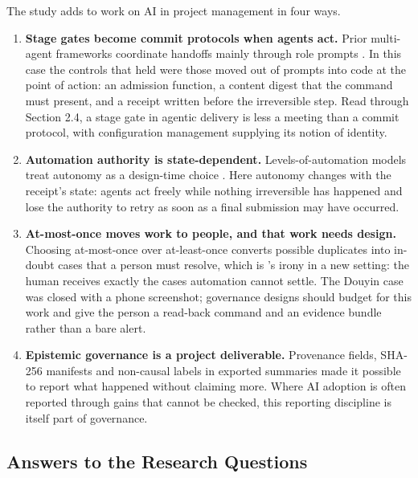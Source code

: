 \documentclass[11pt,a4paper]{article}
\theoremstyle{definition}
\begin{document}
The study adds to work on AI in project management \citep{Holzmann2022, Muller2024, Raisch2021} in four ways.

\begin{enumerate}[leftmargin=1.8em]
    \item \textbf{Stage gates become commit protocols when agents act.} Prior multi-agent frameworks coordinate handoffs mainly through role prompts \citep{Wu2023AutoGen, Hong2023MetaGPT, Qian2024ChatDev}. In this case the controls that held were those moved out of prompts into code at the point of action: an admission function, a content digest that the command must present, and a receipt written before the irreversible step. Read through Section 2.4, a stage gate in agentic delivery is less a meeting than a commit protocol, with configuration management \citep{Whyte2016} supplying its notion of identity.
    \item \textbf{Automation authority is state-dependent.} Levels-of-automation models treat autonomy as a design-time choice \citep{Parasuraman2000, Shneiderman2020}. Here autonomy changes with the receipt's state: agents act freely while nothing irreversible has happened and lose the authority to retry as soon as a final submission may have occurred.
    \item \textbf{At-most-once moves work to people, and that work needs design.} Choosing at-most-once over at-least-once converts possible duplicates into in-doubt cases that a person must resolve, which is \citeauthor{Bainbridge1983}'s \citeyearpar{Bainbridge1983} irony in a new setting: the human receives exactly the cases automation cannot settle. The Douyin case was closed with a phone screenshot; governance designs should budget for this work and give the person a read-back command and an evidence bundle rather than a bare alert.
    \item \textbf{Epistemic governance is a project deliverable.} Provenance fields, SHA-256 manifests and non-causal labels in exported summaries made it possible to report what happened without claiming more. Where AI adoption is often reported through gains that cannot be checked, this reporting discipline is itself part of governance.
\end{enumerate}

\subsection{Answers to the Research Questions}
\label{sec:7.2}
\end{document}
